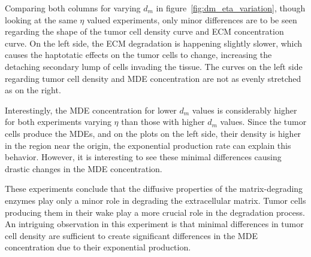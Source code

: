 Comparing both columns for varying $d_m$ in figure~\ref{fig:dm_eta_variation}, though looking at the same $\eta$ valued experiments, only minor differences are to be seen regarding the shape of the tumor cell density curve and ECM concentration curve. On the left side, the ECM degradation is happening slightly slower, which causes the haptotatic effects on the tumor cells to change, increasing the detaching secondary lump of cells invading the tissue. The curves on the left side regarding tumor cell density and MDE concentration are not as evenly stretched as on the right.

Interestingly, the MDE concentration for lower $d_m$ values is considerably higher for both experiments varying $\eta$ than those with higher $d_m$ values. Since the tumor cells produce the MDEs, and on the plots on the left side, their density is higher in the region near the origin, the exponential production rate can explain this behavior. However, it is interesting to see these minimal differences causing drastic changes in the MDE concentration. 

These experiments conclude that the diffusive properties of the matrix-degrading enzymes play only a minor role in degrading the extracellular matrix. Tumor cells producing them in their wake play a more crucial role in the degradation process. An intriguing observation in this experiment is that minimal differences in tumor cell density are sufficient to create significant differences in the MDE concentration due to their exponential production.

